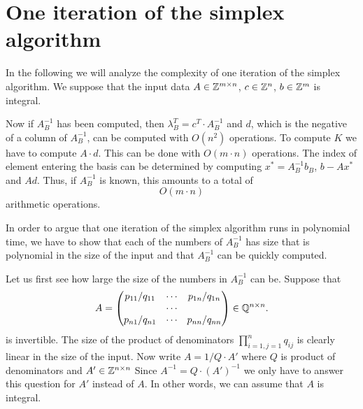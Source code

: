 
\section{One iteration of the simplex algorithm}
\label{sec:one-iter-simpl}


In the following we will analyze the complexity of one iteration of the simplex algorithm.  We suppose that the 
input data  $A \in \mathbb{Z}^{m\times n}$, $c \in \mathbb{Z}^n$, $b \in \mathbb{Z}^{m}$ is integral. 

Now if $A_B^{-1}$ has been computed, then $\lambda_B^T = c^T \cdot
A_B^{-1} $ and $d$, which is the negative of a column of $A_B^{-1}$,
can be computed with $O(n^2)$ operations.  To compute $K$ we have to
compute $A\cdot d$. This can be done with $O(m\cdot n)$
operations. The index of element entering the basis can be determined
by computing $x^* = A_B^{-1} b_B$, $b - Ax^*$ and $Ad$.  Thus, if
$A_B^{-1}$ is known, this amounts to a total of
  \begin{displaymath}
    O(m \cdot n) 
  \end{displaymath}
  arithmetic operations.
  

In order to argue that one iteration of the simplex algorithm runs in polynomial time, we have to show that  each of the numbers of  $A_B^{-1}$ has size that is polynomial in the size of the input and that 
$A_B^{-1}$ can be quickly computed. 


Let us first see how large the size of the numbers in $A_B^{-1}$ can be. 
Suppose that 
\begin{displaymath} 
  A =
  \begin{pmatrix}
    p_{11}/q_{11} & \cdots & p_{1n}/q_{1n} \\
             & \cdots &  \\
   p_{n1}/q_{n1} & \cdots & p_{nn}/q_{nn} \\
  \end{pmatrix} \in \mathbb{Q}^{n\times n}.  
\end{displaymath}
is invertible. 
The {size}  of the product of denominators $\prod_{i=1,j=1}^n q_{ij}$
is  
clearly  linear in the size of the input. 
Now write $A = 1/Q \cdot A'$ where $Q$ is product of denominators and $A'\in
  \mathbb{Z}^{n\times n}$  
 Since $A^{-1} = Q\cdot (A')^{-1} $ we only have to answer  this question for $A'$ instead of $A$. In other words, we can  assume that $A$ is integral. 



